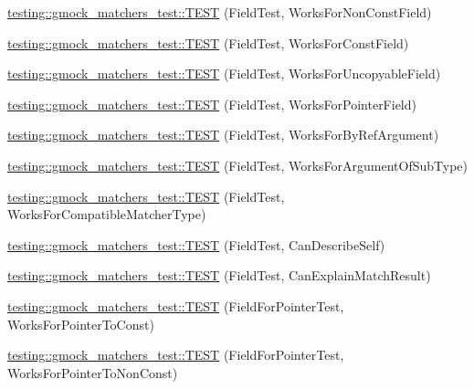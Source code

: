 \begin{DoxyCompactItemize}
\item 
\hyperlink{namespacetesting_1_1gmock__matchers__test_a57213a63527bbd66c024dd1cfafe92d1}{testing\+::gmock\+\_\+matchers\+\_\+test\+::\+T\+E\+ST} (Field\+Test, Works\+For\+Non\+Const\+Field)
\item 
\hyperlink{namespacetesting_1_1gmock__matchers__test_a065efc397a420d3dde87909b4a9a6285}{testing\+::gmock\+\_\+matchers\+\_\+test\+::\+T\+E\+ST} (Field\+Test, Works\+For\+Const\+Field)
\item 
\hyperlink{namespacetesting_1_1gmock__matchers__test_ac26d681f09865b0727ca32343d974907}{testing\+::gmock\+\_\+matchers\+\_\+test\+::\+T\+E\+ST} (Field\+Test, Works\+For\+Uncopyable\+Field)
\item 
\hyperlink{namespacetesting_1_1gmock__matchers__test_a56b1c75b98aaa5c9d3a6dec2d3ba30dc}{testing\+::gmock\+\_\+matchers\+\_\+test\+::\+T\+E\+ST} (Field\+Test, Works\+For\+Pointer\+Field)
\item 
\hyperlink{namespacetesting_1_1gmock__matchers__test_afcb890c159493e250477408a453b08d1}{testing\+::gmock\+\_\+matchers\+\_\+test\+::\+T\+E\+ST} (Field\+Test, Works\+For\+By\+Ref\+Argument)
\item 
\hyperlink{namespacetesting_1_1gmock__matchers__test_ae720452c3587433e26bea2ea7e91f8e6}{testing\+::gmock\+\_\+matchers\+\_\+test\+::\+T\+E\+ST} (Field\+Test, Works\+For\+Argument\+Of\+Sub\+Type)
\item 
\hyperlink{namespacetesting_1_1gmock__matchers__test_a27058ed7297742f08419bc5feb3ef687}{testing\+::gmock\+\_\+matchers\+\_\+test\+::\+T\+E\+ST} (Field\+Test, Works\+For\+Compatible\+Matcher\+Type)
\item 
\hyperlink{namespacetesting_1_1gmock__matchers__test_ac43583cb3c4221aa6bd0132c2cb3fed6}{testing\+::gmock\+\_\+matchers\+\_\+test\+::\+T\+E\+ST} (Field\+Test, Can\+Describe\+Self)
\item 
\hyperlink{namespacetesting_1_1gmock__matchers__test_ae1279ce8e2a3a6c6f0d4dbe436c9da02}{testing\+::gmock\+\_\+matchers\+\_\+test\+::\+T\+E\+ST} (Field\+Test, Can\+Explain\+Match\+Result)
\item 
\hyperlink{namespacetesting_1_1gmock__matchers__test_af5c12cdd12f8778074ad0714b83858ed}{testing\+::gmock\+\_\+matchers\+\_\+test\+::\+T\+E\+ST} (Field\+For\+Pointer\+Test, Works\+For\+Pointer\+To\+Const)
\item 
\hyperlink{namespacetesting_1_1gmock__matchers__test_ac339a26bf6100a2eb2dd4bf908f8448c}{testing\+::gmock\+\_\+matchers\+\_\+test\+::\+T\+E\+ST} (Field\+For\+Pointer\+Test, Works\+For\+Pointer\+To\+Non\+Const)

\end{DoxyCompactItemize}
